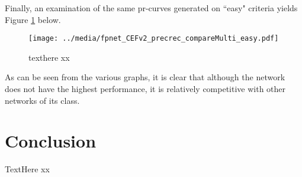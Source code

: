 Finally, an examination of the same pr-curves generated on ``easy" criteria yields Figure \ref{fpnet_CEFv2_precrec_compareMulti_easy} below.

\begin{figure}[h]
    \centering
    \texttt{[image: ../media/fpnet\_CEFv2\_precrec\_compareMulti\_easy.pdf]}
    \caption{texthere xx}
    \label{fpnet_CEFv2_precrec_compareMulti_easy}
\end{figure}


As can be seen from the various graphs, it is clear that although the network does not have the highest performance, it is relatively competitive with other networks of its class. 


\newpage
\section{Conclusion}
TextHere xx
